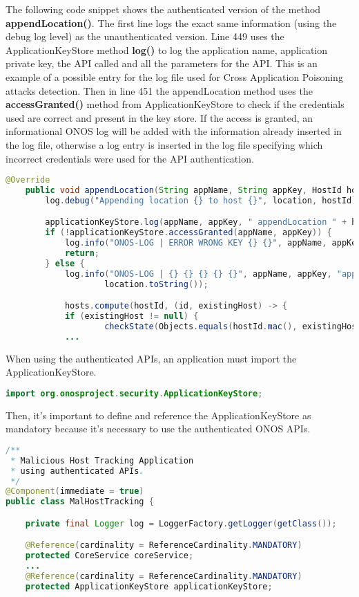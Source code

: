 \documentclass[a4paper,10pt]{memoir}
\begin{document}
The following code snippet shows the authenticated version of the method \textbf{appendLocation()}. The first line logs the exact same information (using the debug log level) as the unauthenticated version. Line 449 uses the ApplicationKeyStore method \textbf{log()} to log the application name, application private key, the API called and all the parameters for the API. This is an example of a possible entry for the log file used for Cross Application Poisoning attacks detection. Then in line 451 the appendLocation method uses the \textbf{accessGranted()} method from ApplicationKeyStore to check if the credentials used are correct and present in the key store. If the access is granted, an informational ONOS log will be added with the information already inserted in the log file, otherwise a log entry is inserted in the log file specifying which incorrect credentials were used for the API authentication.
\begin{lstlisting}[language=java,firstnumber=445]
    @Override
    public void appendLocation(String appName, String appKey, HostId hostId, HostLocation location) {
        log.debug("Appending location {} to host {}", location, hostId);

        applicationKeyStore.log(appName, appKey, " appendLocation " + hostId.toString() + " " + location.toString());
        if (!applicationKeyStore.accessGranted(appName, appKey)) {
            log.info("ONOS-LOG | ERROR WRONG KEY {} {}", appName, appKey);
            return;
        } else {
            log.info("ONOS-LOG | {} {} {} {} {}", appName, appKey, "appendLocation", hostId.toString(),
                    location.toString());

            hosts.compute(hostId, (id, existingHost) -> {
            if (existingHost != null) {
                    checkState(Objects.equals(hostId.mac(), existingHost.mac()), "Existing and new MAC addresses differ.");
            ...
\end{lstlisting}

When using the authenticated APIs, an application must import the ApplicationKeyStore.
\begin{lstlisting}[language=java,firstnumber=45]
import org.onosproject.security.ApplicationKeyStore;
\end{lstlisting}

Then, it's important to define and  reference the ApplicationKeyStore as mandatory because it's necessary to use the authenticated ONOS APIs.
\begin{lstlisting}[language=java,firstnumber=47]
/**
 * Malicious Host Tracking Application
 * using authenticated APIs.
 */
@Component(immediate = true)
public class MalHostTracking {

    private final Logger log = LoggerFactory.getLogger(getClass());

    @Reference(cardinality = ReferenceCardinality.MANDATORY)
    protected CoreService coreService;
    ...
    @Reference(cardinality = ReferenceCardinality.MANDATORY)
    protected ApplicationKeyStore applicationKeyStore;
\end{lstlisting}
\end{document}
